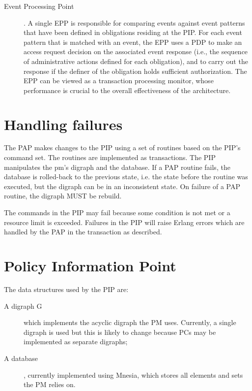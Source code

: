 \documentclass[12pt,a4paper,titlepage]{book}
\begin{document}
\begin{description}
		\item[Event Processing Point]. A single EPP is responsible for comparing events against event patterns that have been defined in obligations residing at the PIP. For each event pattern that is matched with an event, the EPP uses a PDP to make an access request decision on the associated event response (i.e., the sequence of administrative actions defined for each obligation), and to carry out the response if the definer of the obligation holds sufficient authorization. The EPP can be viewed as a transaction processing monitor, whose performance is crucial to the overall effectiveness of the architecture.
		
	\end{description}

	\section{Handling failures}
	
	The PAP makes changes to the PIP using a set of routines based on the PIP's command set. The routines are implemented as transactions. The PIP manipulates the pm's digraph and the database. If a PAP routine fails, the database is rolled-back to the previous state, i.e. the state before the routine was executed, but the digraph can be in an inconsistent state. On failure of a PAP routine, the digraph MUST be rebuild.
	
	The commands in the PIP may fail because some condition is not met or a resource limit is exceeded. Failures in the PIP will raise Erlang errors which are handled by the PAP in the transaction as described.

	\section{Policy Information Point}
	
	The data structures used by the PIP are:
	
	\begin{description}

		\item[A digraph G] which implements the acyclic digraph the PM uses. Currently, a single digraph is used but this is likely to change because PCs may be implemented as separate digraphs;
		
		\item[A database], currently implemented using Mnesia, which stores all elements and sets the PM relies on.
		
	\end{description}
	
\end{document}
